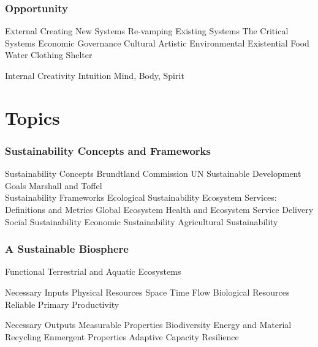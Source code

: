 \documentclass[12pt, letterpaper]{article}
\begin{document}
\subsubsection{Opportunity}
\begin{outline}[enumerate]
\1 External
\2 Creating New Systems
\2 Re-vamping Existing Systems
\2 The Critical Systems
\3 Economic
\3 Governance
\3 Cultural
\3 Artistic
\3 Environmental
\3 Existential
\4 Food
\4 Water
\4 Clothing
\4 Shelter


\1 Internal
\2 Creativity
\2 Intuition
\2 Mind, Body, Spirit

\end{outline}


\section{Topics}
\setcounter{subsubsection}{2} %
\subsubsection{Sustainability Concepts and Frameworks}
\begin{outline}[enumerate]
\1 Sustainability Concepts
\2 Brundtland Commission
\2 UN Sustainable Development Goals
\2 Marshall and Toffel\\

\1 Sustainability Frameworks
\2 Ecological Sustainability
\3 Ecosystem Services: Definitions and Metrics
\3 Global Ecosystem Health and Ecosystem Service Delivery
\2 Social Sustainability
\2 Economic Sustainability
\2 Agricultural Sustainability

\end{outline}


\subsubsection{A Sustainable Biosphere}
\begin{outline}[enumerate]
\1 Functional Terrestrial and Aquatic Ecosystems

\2 Necessary Inputs
\3 Physical Resources
\4 Space
\4 Time
\4 Flow
\3 Biological Resources
\4 Reliable Primary Productivity

\2 Necessary Outputs
\3 Measurable Properties
\4 Biodiversity
\4 Energy and Material Recycling
\3 Enmergent Properties
\4 Adaptive Capacity
\4 Resilience 

\end{outline}
\end{document}
